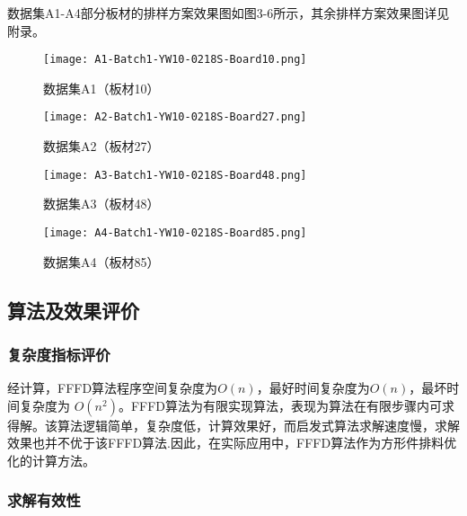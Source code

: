 \documentclass[bwprint]{gmcmthesis}
\begin{document}
        数据集A1-A4部分板材的排样方案效果图如图3-6所示，其余排样方案效果图详见附录。
        \begin{figure}[!htbp]
            \centering
            \begin{minipage}{0.48\linewidth}
                \centering
                \texttt{[image: A1-Batch1-YW10-0218S-Board10.png]}
                \caption{数据集A1（板材10）}
            \end{minipage}
            \begin{minipage}{0.48\linewidth}
                \centering
                \texttt{[image: A2-Batch1-YW10-0218S-Board27.png]}
                \caption{数据集A2（板材27）}
            \end{minipage}
        \end{figure}
        \begin{figure}[!htbp]
            \centering
            \begin{minipage}{0.48\linewidth}
                \centering
                \texttt{[image: A3-Batch1-YW10-0218S-Board48.png]}
                \caption{数据集A3（板材48）}
            \end{minipage}
            \begin{minipage}{0.48\linewidth}
                \centering
                \texttt{[image: A4-Batch1-YW10-0218S-Board85.png]}
                \caption{数据集A4（板材85）}
            \end{minipage}
        \end{figure}
	

\subsection{算法及效果评价}

\subsubsection{复杂度指标评价}  

经计算，FFFD算法程序空间复杂度为$O(n)$，最好时间复杂度为$O(n)$，最坏时间复杂度为 $ O(n^2) $。FFFD算法为有限实现算法，表现为算法在有限步骤内可求得解。该算法逻辑简单，复杂度低，计算效果好，而启发式算法求解速度慢，求解效果也并不优于该FFFD算法.因此，在实际应用中，FFFD算法作为方形件排料优化的计算方法。


\subsubsection{求解有效性}
	
\end{document}
